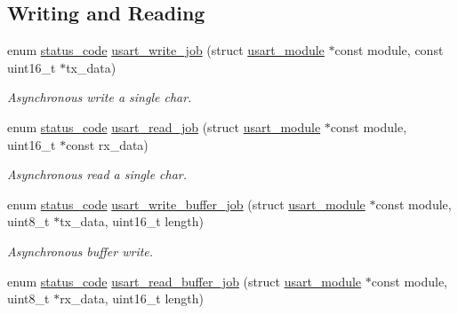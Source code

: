 \subsection*{Writing and Reading}
\begin{DoxyCompactItemize}
\item 
enum \mbox{\hyperlink{group__group__sam0__utils__status__codes_ga751c892e5a46b8e7d282085a5a5bf151}{status\+\_\+code}} \mbox{\hyperlink{group__asfdoc__sam0__sercom__usart__group_ga3e68847c609aa708be3e1f282f760e8d}{usart\+\_\+write\+\_\+job}} (struct \mbox{\hyperlink{structusart__module}{usart\+\_\+module}} $\ast$const module, const uint16\+\_\+t $\ast$tx\+\_\+data)
\begin{DoxyCompactList}\small\item\em Asynchronous write a single char. \end{DoxyCompactList}\item 
enum \mbox{\hyperlink{group__group__sam0__utils__status__codes_ga751c892e5a46b8e7d282085a5a5bf151}{status\+\_\+code}} \mbox{\hyperlink{group__asfdoc__sam0__sercom__usart__group_ga095085e94cc009c31243df62395896fd}{usart\+\_\+read\+\_\+job}} (struct \mbox{\hyperlink{structusart__module}{usart\+\_\+module}} $\ast$const module, uint16\+\_\+t $\ast$const rx\+\_\+data)
\begin{DoxyCompactList}\small\item\em Asynchronous read a single char. \end{DoxyCompactList}\item 
enum \mbox{\hyperlink{group__group__sam0__utils__status__codes_ga751c892e5a46b8e7d282085a5a5bf151}{status\+\_\+code}} \mbox{\hyperlink{group__asfdoc__sam0__sercom__usart__group_ga2811c1f5cd7fdcf653eac02812f2265c}{usart\+\_\+write\+\_\+buffer\+\_\+job}} (struct \mbox{\hyperlink{structusart__module}{usart\+\_\+module}} $\ast$const module, uint8\+\_\+t $\ast$tx\+\_\+data, uint16\+\_\+t length)
\begin{DoxyCompactList}\small\item\em Asynchronous buffer write. \end{DoxyCompactList}\item 
enum \mbox{\hyperlink{group__group__sam0__utils__status__codes_ga751c892e5a46b8e7d282085a5a5bf151}{status\+\_\+code}} \mbox{\hyperlink{group__asfdoc__sam0__sercom__usart__group_ga95b1e55af02e69454ecff04c3d712527}{usart\+\_\+read\+\_\+buffer\+\_\+job}} (struct \mbox{\hyperlink{structusart__module}{usart\+\_\+module}} $\ast$const module, uint8\+\_\+t $\ast$rx\+\_\+data, uint16\+\_\+t length)

\end{DoxyCompactItemize}
